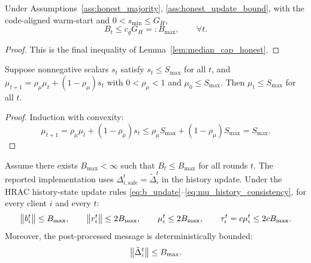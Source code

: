 \begin{corollary}
\label{cor:Bmax_from_honest}
Under Assumptions~\ref{ass:honest_majority},
\ref{ass:honest_update_bound}, with the code-aligned warm-start and
\(0<s_{\min}\le G_H\),
\begin{equation}
    B_t
    \le
    c_g G_H
    =: B_{\max},
    \qquad \forall t.
    \label{eq:Bmax_from_honest}
\end{equation}
\end{corollary}

\begin{proof}
This is the final inequality of Lemma~\ref{lem:median_cap_honest}.
\end{proof}

\begin{lemma}
\label{lem:mu_ema_bounded}
Suppose nonnegative scalars \(s_t\) satisfy \(s_t\le S_{\max}\) for all \(t\),
and \(\mu_{t+1}=\rho_\mu\mu_t+(1-\rho_\mu)s_t\) with \(0<\rho_\mu<1\) and
\(\mu_0\le S_{\max}\). Then \(\mu_t\le S_{\max}\) for all \(t\).
\end{lemma}

\begin{proof}
Induction with convexity:
\[
    \mu_{t+1}
    =
    \rho_\mu\mu_t+(1-\rho_\mu)s_t
    \le
    \rho_\mu S_{\max}+(1-\rho_\mu)S_{\max}
    =
    S_{\max}.
\]
\end{proof}

\begin{lemma}
\label{lem:mu_tau_bounded}
Assume there exists \(B_{\max}<\infty\) such that \(B_t\le B_{\max}\) for all
rounds \(t\). The reported implementation uses
\(\Delta_{i,\mathrm{safe}}^t=\tilde{\Delta}_i^t\) in the history update.
Under the HRAC history-state update rules
\eqref{eq:b_update}--\eqref{eq:mu_history_consistency}, for every client
\(i\) and every \(t\):
\begin{equation}
    \left\lVert b_i^t \right\rVert\le B_{\max},
    \qquad
    \left\lVert r_i^t \right\rVert\le 2B_{\max},
    \qquad
    \mu_i^t\le 2B_{\max},
    \qquad
    \tau_i^t=c\mu_i^t\le 2cB_{\max}.
    \label{eq:mu_tau_bounds}
\end{equation}
Moreover, the post-processed message is deterministically bounded:
\begin{equation}
    \left\lVert \tilde\Delta_i^t \right\rVert\le B_{\max}.
    \label{eq:tilde_delta_det_bound}
\end{equation}
\end{lemma}

